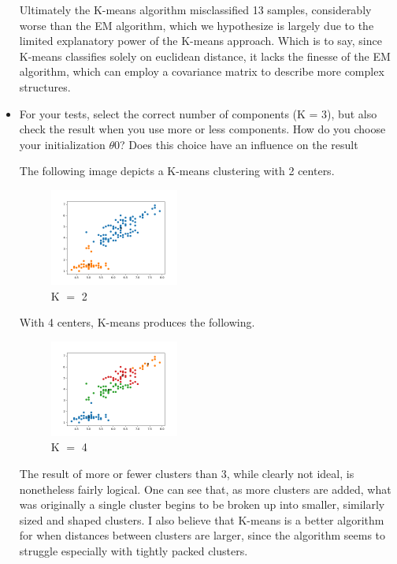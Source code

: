 \documentclass[a4paper]{article}
\begin{document}
\begin{itemize}
	Ultimately the K-means algorithm misclassified 13 samples, considerably worse than the EM algorithm, which we hypothesize is largely due to the limited explanatory power of the K-means approach.  Which is to say, since K-means classifies solely on euclidean distance, it lacks the finesse of the EM algorithm, which can employ a covariance matrix to describe more complex structures.

	\clearpage
	\item For your tests, select the correct number of components (K = 3), but also check the result when you use more or less components. How do you choose your initialization $\theta$0? Does this choice have an inﬂuence on the result

	The following image depicts a K-means clustering with 2 centers.
	\begin{figure}[h]
		\begin{center}
			\includegraphics[width=0.4\textwidth]{kmeans_2centers.png}
			\caption{K $=$ 2}
		\end{center}
	\end{figure}

	With 4 centers, K-means produces the following.
	\begin{figure}[h]
		\begin{center}
			\includegraphics[width=0.4\textwidth]{kmeans_4centers.png}
			\caption{K $=$ 4}
		\end{center}
	\end{figure}
	
	The result of more or fewer clusters than 3, while clearly not ideal, is nonetheless fairly logical.  One can see that, as more clusters are added, what was originally a single cluster begins to be broken up into smaller, similarly sized and shaped clusters.  I also believe that K-means is a better algorithm for when distances between clusters are larger, since the algorithm seems to struggle especially with tightly packed clusters.


\end{itemize}
\end{document}
